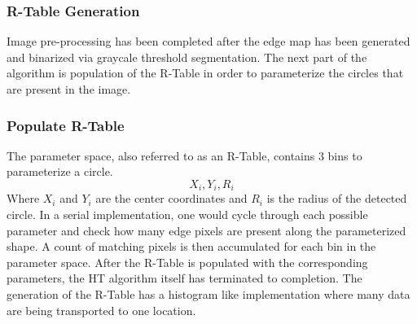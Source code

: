 \documentclass[12pt]{article}
\begin{document}
\subsubsection*{R-Table Generation}
Image pre-processing has been completed after the edge map has been generated and binarized via graycale threshold segmentation.
The next part of the algorithm is population of the R-Table in order to parameterize the circles that are present in the image.
\subsubsection*{Populate R-Table}
The parameter space, also referred to as an R-Table, contains 3 bins to parameterize a circle.
\begin{equation}
  X_{i}, Y_{i}, R_{i}\label{circle-parameters}
\end{equation}
Where $X_i$ and $Y_i$ are the center coordinates and $R_i$ is the radius of the detected circle.
In a serial implementation, one would cycle through each possible parameter and check how many edge pixels are present along the parameterized shape. 
A count of matching pixels is then accumulated for each bin in the parameter space.
After the R-Table is populated with the corresponding parameters, the HT algorithm itself has terminated to completion.
The generation of the R-Table has a histogram like implementation where many data are being transported to one location.
\end{document}
